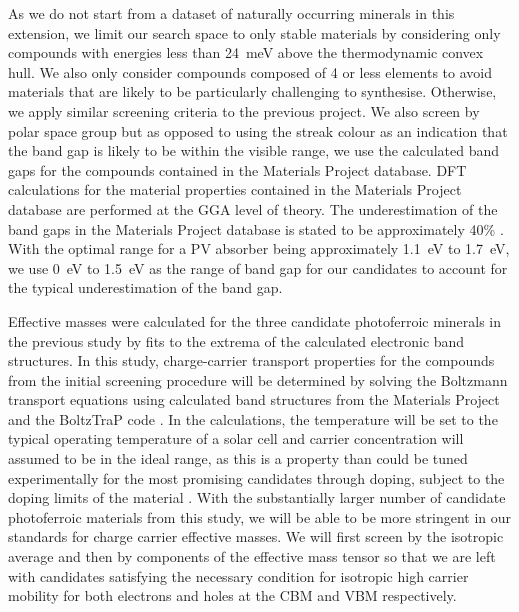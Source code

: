 \documentclass[11pt, twoside]{report}
\begin{document}
As we do not start from a dataset of naturally occurring minerals in this extension, we limit our search space to only stable materials by considering only compounds with energies less than \SI{24}{meV} above the thermodynamic convex hull. We also only consider compounds composed of 4 or less elements to avoid materials that are likely to be particularly challenging to synthesise. 
Otherwise, we apply similar screening criteria to the previous project. We also screen by polar space group but as opposed to using the streak colour as an indication that the band gap is likely to be within the visible range, we use the calculated band gaps for the compounds contained in the Materials Project database. DFT calculations for the material properties contained in the Materials Project database are performed at the GGA level of theory.
The underestimation of the band gaps in the Materials Project database is stated to be approximately 40\% \cite{MP_bandgaps, MP_highthroughput}. With the optimal range for a PV absorber being approximately \SI{1.1}{eV} to \SI{1.7}{eV}, we use \SI{0}{eV} to \SI{1.5}{eV} as the range of band gap for our candidates to account for the typical underestimation of the band gap. 

Effective masses were calculated for the three candidate photoferroic minerals in the previous study by fits to the extrema of the calculated electronic band structures. In this study, charge-carrier transport properties for the compounds from the initial screening procedure will be determined by solving the Boltzmann transport equations using calculated band structures from the Materials Project and the BoltzTraP code \cite{Boltztrap}. In the calculations, the temperature will be set to the typical operating temperature of a solar cell and carrier concentration will assumed to be in the ideal range, as this is a property than could be tuned experimentally for the most promising candidates through doping, subject to the doping limits of the material \cite{Zhang_doping_limits}. 
With the substantially larger number of candidate photoferroic materials from this study, we will be able to be more stringent in our standards for charge carrier effective masses. We will first screen by the isotropic average and then by components of the effective mass tensor so that we are left with candidates satisfying the necessary condition for isotropic high carrier mobility for both electrons and holes at the CBM and VBM respectively.

\end{document}
